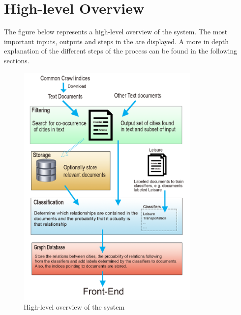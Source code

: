 \section{High-level Overview}
The figure below represents a high-level overview of the system. The most important inputs, outputs and steps in the are displayed. A more in depth explanation of the different steps of the process can be found in the following sections.

\begin{figure}[H]
\centering
\includegraphics[width=0.8\textwidth]{System-overview-3}
\caption{High-level overview of the system}
\label{fig:overview}
\end{figure}
